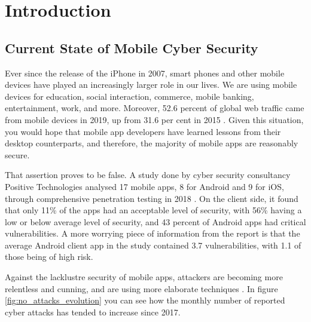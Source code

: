 \chapter{Introduction}
	\label{chap:intro}
	
	\section{Current State of Mobile Cyber Security}
		\label{sec:intro_motivation} 
		
		Ever since the release of the iPhone in 2007, smart phones and other mobile devices have played an increasingly larger role in our lives. We are using mobile devices for education, social interaction, commerce, mobile banking, entertainment, work, and more. Moreover, 52.6 percent of global web traffic came from mobile devices in 2019, up from 31.6 per cent in 2015 \cite{statista_mobile_web_traffic}. Given this situation, you would hope that mobile app developers have learned lessons from their desktop counterparts, and therefore, the majority of mobile apps are reasonably secure.
		
		That assertion proves to be false. A study done by cyber security consultancy Positive Technologies analysed 17 mobile apps, 8 for Android and 9 for iOS, through comprehensive penetration testing in 2018 \cite{pt_mobile_apps_2019}. On the client side, it found that only 11\% of the apps had an acceptable level of security, with 56\% having a low or below average level of security, and 43 percent of Android apps had critical vulnerabilities. A more worrying piece of information from the report is that the average Android client app in the study contained 3.7 vulnerabilities, with 1.1 of those being of high risk.
		
		Against the lacklustre security of mobile apps, attackers are becoming more relentless and cunning, and are using more elaborate techniques \cite{pt_threatscape_2018}. In figure \ref{fig:no_attacks_evolution} you can see
		how the monthly number of reported cyber attacks has tended to increase since 2017.
		
